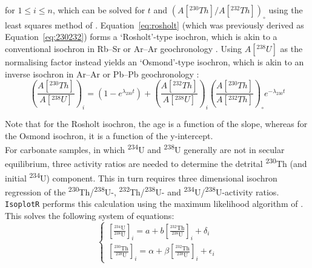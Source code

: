 \begin{refsection}
\noindent for $1 \leq i \leq n$, which can be solved for $t$ and
$\left(A[{}^{230}Th]/A[{}^{232}Th]\right)_{\!\circ}$ using the least
squares method of \citet{york2004}. Equation~\ref{eq:rosholt} (which
was previously derived as Equation~\ref{eq:230232}) forms a
`Rosholt'-type isochron, which is akin to a conventional isochron in
Rb--Sr or Ar--Ar geochronology \citep{rosholt1976}. Using
$A[{}^{238}U]$ as the normalising factor instead yields an
`Osmond'-type isochron, which is akin to an inverse isochron in Ar--Ar
or Pb--Pb geochronology \citep{osmond1970, ludwig2003b}:
\begin{equation}
  \left(\frac{A[{}^{230}Th]}{A[{}^{238}U]}\right)_i =
  \left(1-e^{\lambda_{230}t}\right) +
  \left(\frac{A[{}^{232}Th]}{A[{}^{238}U]}\right)_i
  \left(\frac{A[{}^{230}Th]}{A[{}^{232}Th]}\right)_\circ
  e^{-\lambda_{230}t}
  \label{eq:osmond}
\end{equation}

Note that for the Rosholt isochron, the age is a function of the
slope, whereas for the Osmond isochron, it is a function of the
y-intercept.\\

For carbonate samples, in which \textsuperscript{234}U and
\textsuperscript{238}U generally are not in secular equilibrium, three
activity ratios are needed to determine the detrital
\textsuperscript{230}Th (and initial \textsuperscript{234}U)
component. This in turn requires three dimensional isochron regression
of the \textsuperscript{230}Th/\textsuperscript{238}U-,
\textsuperscript{232}Th/\textsuperscript{238}U- and
\textsuperscript{234}U/\textsuperscript{238}U-activity
ratios. \texttt{IsoplotR} performs this calculation using the maximum
likelihood algorithm of \citet{ludwig1994}. This solves the following
system of equations:
\begin{equation}
  \begin{cases}
    \left[\frac{{}^{234}\mbox{U}}{{}^{238}\mbox{U}}\right]_i =
    a + b \left[\frac{{}^{232}\mbox{Th}}{{}^{238}\mbox{U}}\right]_i +
    \delta_i \\
    \left[\frac{{}^{230}\mbox{Th}}{{}^{238}\mbox{U}}\right]_i =
    \alpha + \beta \left[\frac{{}^{232}\mbox{Th}}{{}^{238}\mbox{U}}\right]_i +
    \epsilon_i
  \end{cases}
  \label{eq:titterington}
\end{equation}


\end{refsection}
